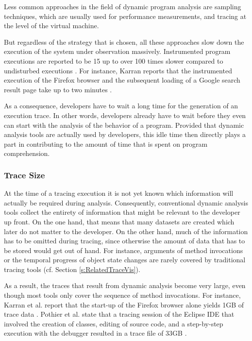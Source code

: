 Less common approaches in the field of dynamic program analysis are sampling techniques, which are usually used for performance measurements, and tracing at the level of the virtual machine.

But regardless of the strategy that is chosen, all these approaches slow down the execution of the system under observation massively.
Instrumented program executions are reported to be 15 up to over 100 times slower compared to undisturbed executions \cite{pothier_scalable_2007, karran_synctrace:_2013}.
For instance, Karran reports that the instrumented execution of the Firefox browser and the subsequent loading of a Google search result page take up to two minutes \cite{karran_extraction_2013}.

As a consequence, developers have to wait a long time for the generation of an execution trace.
In other words, developers already have to wait before they even can start with the analysis of the behavior of a program.
Provided that dynamic analysis tools are actually used by developers, this idle time then directly plays a part in contributing to the amount of time that is spent on program comprehension.

\subsubsection{Trace Size}
At the time of a tracing execution it is not yet known which information will actually be required during analysis.
Consequently, conventional dynamic analysis tools collect the entirety of information that might be relevant to the developer up front.
On the one hand, that means that many datasets are created which later do not matter to the developer.
On the other hand, much of the information has to be omitted during tracing, since otherwise the amount of data that has to be stored would get out of hand.
For instance, arguments of method invocations or the temporal progress of object state changes are rarely covered by traditional tracing tools (cf. Section \ref{s:RelatedTraceVis}).

As a result, the traces that result from dynamic analysis become very large, even though most tools only cover the sequence of method invocations.
For instance, Karran et al. report that the start-up of the Firefox browser alone yields 1GB of trace data \cite{karran_extraction_2013}.
Pothier et al. state that a tracing session of the Eclipse IDE that involved the creation of classes, editing of source code, and a step-by-step execution with the debugger resulted in a trace file of 33GB \cite{pothier_scalable_2007}.

